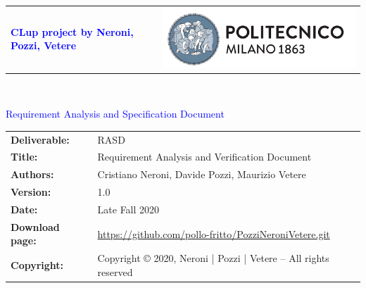 


\sffamily
    
    
    \begin{titlepage}
        

        
        {\begin{table}[t!]
                \centering
                \begin{tabu} to \textwidth { X[1.3,r,p] X[1.7,l,p] }
                    \textcolor{Blue}
                    {\textbf{\small{\textsf{CLup project by Neroni, Pozzi, Vetere}}}} & \includegraphics[scale=0.4]{Images/PolimiLogo}
                \end{tabu}
            \end{table}}~\\ [7cm]
        
        \begin{flushleft}
             
            {\textcolor{blue}{\textrm{\Huge{Requirement Analysis and Specification Document}}}} \\ [1cm]
            
        \end{flushleft}
        
    \end{titlepage}
    
    \begin{table}[h!]
        \begin{tabu} to \textwidth { X[0.3,r,p] X[0.7,l,p] }
            \hline
            
            \textbf{Deliverable:} & RASD\\
            \textbf{Title:} & Requirement Analysis and Verification Document \\
            \textbf{Authors:} & Cristiano Neroni, Davide Pozzi, Maurizio Vetere \\
            \textbf{Version:} & 1.0 \\ 
            \textbf{Date:} & Late Fall 2020 \\
            \textbf{Download page:} & \small \url{https://github.com/pollo-fritto/PozziNeroniVetere.git} \\
            \textbf{Copyright:} & Copyright © 2020, Neroni | Pozzi | Vetere – All rights reserved \\
            \hline
        \end{tabu}
    \end{table}
    
